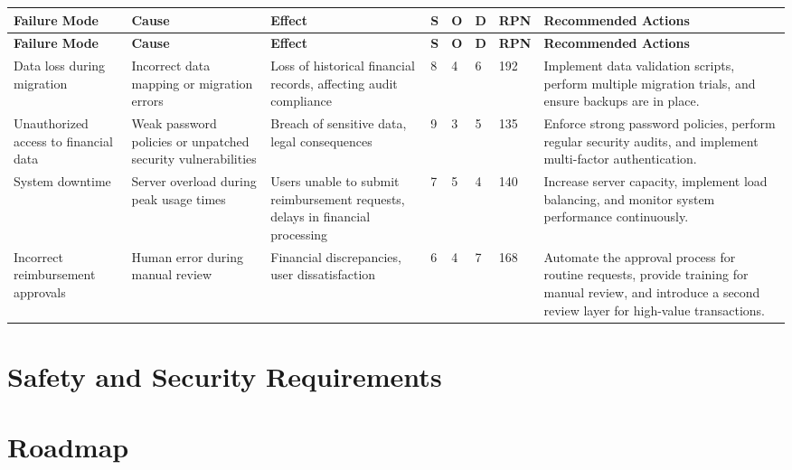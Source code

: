 \documentclass{article}
\begin{document}
\begin{longtable}{|p{3cm}|p{3cm}|p{3cm}|p{1cm}|p{1cm}|p{1cm}|p{1cm}|p{4cm}|}
    \hline
    \textbf{Failure Mode} & \textbf{Cause} & \textbf{Effect} & \textbf{S} & \textbf{O} & \textbf{D} & \textbf{RPN} & \textbf{Recommended Actions} \\ \hline
    \endfirsthead
    
    \hline
    \textbf{Failure Mode} & \textbf{Cause} & \textbf{Effect} & \textbf{S} & \textbf{O} & \textbf{D} & \textbf{RPN} & \textbf{Recommended Actions} \\ \hline
    \endhead
    
    Data loss during migration & Incorrect data mapping or migration errors & Loss of historical financial records, affecting audit compliance & 8 & 4 & 6 & 192 & Implement data validation scripts, perform multiple migration trials, and ensure backups are in place. \\ \hline
    Unauthorized access to financial data & Weak password policies or unpatched security vulnerabilities & Breach of sensitive data, legal consequences & 9 & 3 & 5 & 135 & Enforce strong password policies, perform regular security audits, and implement multi-factor authentication. \\ \hline
    System downtime & Server overload during peak usage times & Users unable to submit reimbursement requests, delays in financial processing & 7 & 5 & 4 & 140 & Increase server capacity, implement load balancing, and monitor system performance continuously. \\ \hline
    Incorrect reimbursement approvals & Human error during manual review & Financial discrepancies, user dissatisfaction & 6 & 4 & 7 & 168 & Automate the approval process for routine requests, provide training for manual review, and introduce a second review layer for high-value transactions. \\ \hline

\end{longtable}



\section{Safety and Security Requirements}


\section{Roadmap}
\end{document}
